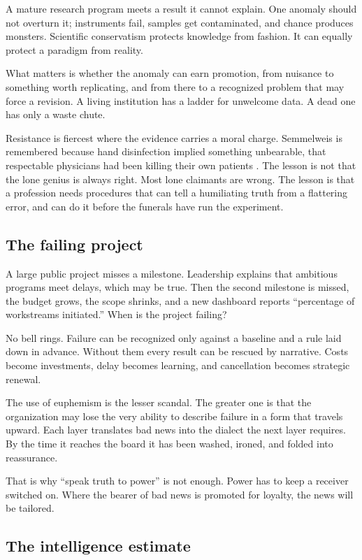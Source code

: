 \documentclass[12pt,a4paper]{book}
\begin{document}
A mature research program meets a result it cannot explain. One anomaly should not overturn it; instruments fail, samples get contaminated, and chance produces monsters. Scientific conservatism protects knowledge from fashion. It can equally protect a paradigm from reality.

What matters is whether the anomaly can earn promotion, from nuisance to something worth replicating, and from there to a recognized problem that may force a revision. A living institution has a ladder for unwelcome data. A dead one has only a waste chute.

Resistance is fiercest where the evidence carries a moral charge. Semmelweis is remembered because hand disinfection implied something unbearable, that respectable physicians had been killing their own patients \cite{semmelweis2024}. The lesson is not that the lone genius is always right. Most lone claimants are wrong. The lesson is that a profession needs procedures that can tell a humiliating truth from a flattering error, and can do it before the funerals have run the experiment.

\subsection{The failing project}

A large public project misses a milestone. Leadership explains that ambitious programs meet delays, which may be true. Then the second milestone is missed, the budget grows, the scope shrinks, and a new dashboard reports ``percentage of workstreams initiated.'' When is the project failing?

No bell rings. Failure can be recognized only against a baseline and a rule laid down in advance. Without them every result can be rescued by narrative. Costs become investments, delay becomes learning, and cancellation becomes strategic renewal.

The use of euphemism is the lesser scandal. The greater one is that the organization may lose the very ability to describe failure in a form that travels upward. Each layer translates bad news into the dialect the next layer requires. By the time it reaches the board it has been washed, ironed, and folded into reassurance.

That is why ``speak truth to power'' is not enough. Power has to keep a receiver switched on. Where the bearer of bad news is promoted for loyalty, the news will be tailored.

\subsection{The intelligence estimate}
\end{document}
